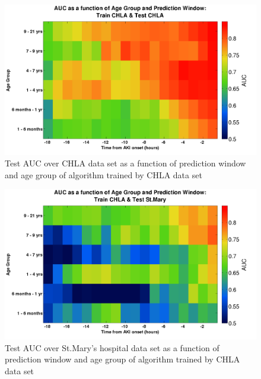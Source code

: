 \documentclass[
   technote
]{phildoc}
\begin{document}
\begin{figure}[!htbp]
\centering
\includegraphics[width=\textwidth]{./figures/auc_age_ism_ism.png}
\caption{Test AUC over CHLA data set as a function of prediction window and age group of algorithm trained by CHLA data set} 
\label{fig:age_ism_ism}      
\end{figure}

\begin{figure}[!htbp]
\centering
\includegraphics[width=\textwidth]{./figures/auc_age_ism_stm.png}
\caption{Test AUC over St.Mary's hospital data set as a function of prediction window and age group of algorithm trained by CHLA data set} 
\label{fig:age_ism_stm}      
\end{figure}
\end{document}
